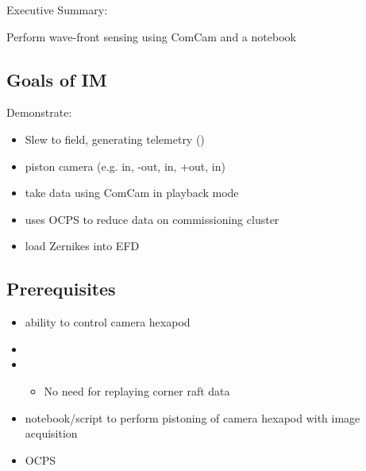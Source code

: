 
Executive Summary:

Perform wave-front sensing using ComCam and a notebook

\subsection{Goals of IM}
Demonstrate:
\begin{itemize}
\item Slew to field, generating telemetry (\cf {})
\item piston camera (e.g. in, -out, in, +out, in)
\item take data using ComCam in playback mode
\item uses \gls{OCPS} to reduce data on commissioning cluster
\item load Zernikes into \gls{EFD}
\end{itemize}

\subsection{Prerequisites}
\begin{itemize}
\item ability to control camera hexapod
\item {}
\item {}
  \begin{itemize}
  \item No need for replaying corner raft data
  \end{itemize}
\item notebook/script to perform pistoning of camera hexapod with image acquisition
\item \gls{OCPS}
\end{itemize}
